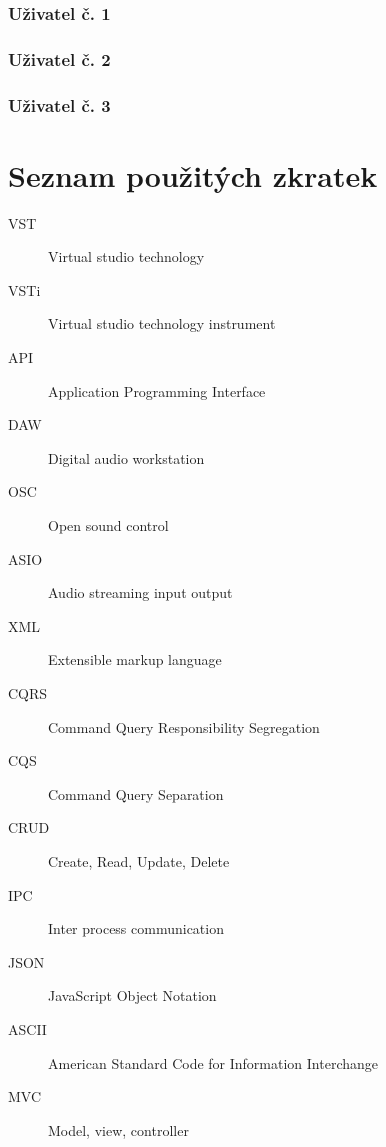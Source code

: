 \documentclass[thesis=M,czech]{FITthesis}[2019/03/06]
\begin{document}
		\subsection{Uživatel č. 1}
		\subsection{Uživatel č. 2}
		\subsection{Uživatel č. 3}
\begin{conclusion}
\end{conclusion}




\appendix

\chapter{Seznam použitých zkratek}
\begin{description}
	\item[VST] Virtual studio technology
	\item[VSTi] Virtual studio technology instrument
	\item[API] Application Programming Interface
	\item[DAW] Digital audio workstation
	\item[OSC] Open sound control
	\item[ASIO] Audio streaming input output
	\item[XML] Extensible markup language
	\item[CQRS] Command Query Responsibility Segregation
	\item[CQS] Command Query Separation
	\item[CRUD] Create, Read, Update, Delete
	\item[IPC] Inter process communication
	\item[JSON] JavaScript Object Notation
	\item[ASCII] American Standard Code for Information Interchange
	\item[MVC] Model, view, controller
\end{description}
\end{document}
